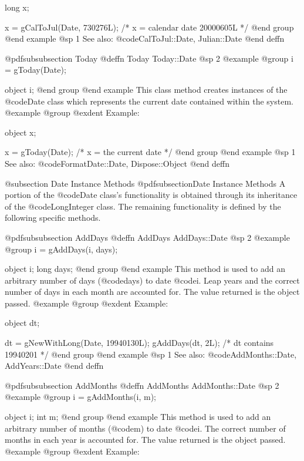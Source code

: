 long  x;

x = gCalToJul(Date, 730276L);
    /*  x = calendar date 20000605L */
@end group
@end example
@sp 1
See also:  @code{CalToJul::Date, Julian::Date}
@end deffn






@pdfsubsubsection {Today}
@deffn {Today} Today::Date
@sp 2
@example
@group
i = gToday(Date);

object  i;
@end group
@end example
This class method creates instances of the @code{Date} class which
represents the current date contained within the system.
@example
@group
@exdent Example:

object  x;

x = gToday(Date);   /*  x = the current date  */
@end group
@end example
@sp 1
See also:  @code{FormatDate::Date, Dispose::Object}
@end deffn










@subsection Date Instance Methods
@pdfsubsection{Date Instance Methods}
A portion of the @code{Date} class's functionality is obtained through
its inheritance of the @code{LongInteger} class.  The remaining
functionality is defined by the following specific methods.







@pdfsubsubsection {AddDays}
@deffn {AddDays} AddDays::Date
@sp 2
@example
@group
i = gAddDays(i, days);

object  i;
long    days;
@end group
@end example
This method is used to add an arbitrary number of days (@code{days}) to
date @code{i}.  Leap years and the correct number of days in each month
are accounted for.  The value returned is the object passed.
@example
@group
@exdent Example:

object  dt;

dt = gNewWithLong(Date, 19940130L);
gAddDays(dt, 2L);   /*  dt contains 19940201  */
@end group
@end example
@sp 1
See also:  @code{AddMonths::Date, AddYears::Date}
@end deffn








@pdfsubsubsection {AddMonths}
@deffn {AddMonths} AddMonths::Date
@sp 2
@example
@group
i = gAddMonths(i, m);

object  i;
int     m;
@end group
@end example
This method is used to add an arbitrary number of months (@code{m}) to
date @code{i}.  The correct number of months in each year
is accounted for.  The value returned is the object passed.
@example
@group
@exdent Example:

